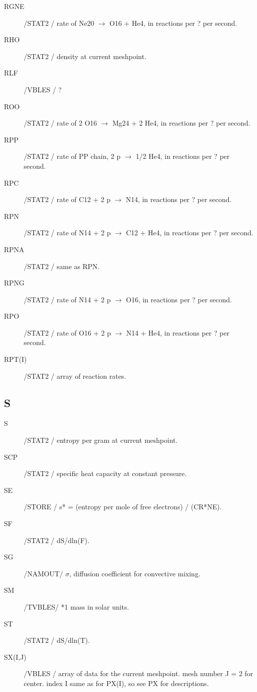 \documentclass{article}
\begin{document}
\begin{description}
	\item[RGNE]		/STAT2 / rate of Ne20 $\to$ O16 + He4, in reactions per ? per second.

    \item[RHO]		    /STAT2 / density at current meshpoint.

    \item[RLF]    	 	/VBLES / ?
    
	\item[ROO]		    /STAT2 / rate of 2 O16 $\to$ Mg24 + 2 He4, in reactions per ? per second.

	\item[RPP]		    /STAT2 / rate of PP chain, 2 p $\to$ 1/2 He4, in reactions per ? per second.

	\item[RPC]		    /STAT2 / rate of C12 + 2 p $\to$ N14, in reactions per ? per second.

	\item[RPN] 		/STAT2 / rate of N14 + 2 p $\to$ C12 + He4, in reactions per ? per second.

	\item[RPNA]		/STAT2 / same as RPN.

	\item[RPNG]		/STAT2 / rate of N14 + 2 p $\to$ O16, in reactions per ? per second.

	\item[RPO]		    /STAT2 / rate of O16 + 2 p $\to$ N14 + He4, in reactions per ? per second.

	\item[RPT(I)]		/STAT2 / array of reaction rates.

\end{description}
\subsection*{S}
\begin{description}
	\item[S]		    /STAT2 / entropy per gram at current meshpoint.

	\item[SCP]		    /STAT2 / specific heat capacity at constant pressure.

	\item[SE]		    /STORE / s* = (entropy per mole of free electrons) / (CR*NE).

	
	\item[SF]		    /STAT2 / dS/dln(F).

	\item[SG]      	/NAMOUT/ $\sigma$, diffusion coefficient for convective mixing.

	\item[SM]		    /TVBLES/ *1 mass in solar units.

	\item[ST]		    /STAT2 / dS/dln(T).

	\item[SX(I,J)]		/VBLES / array of data for the current meshpoint.  mesh number J = 2 for center. 
	                index I same as for PX(I), so see PX for descriptions.
	
\end{description}
\end{document}
